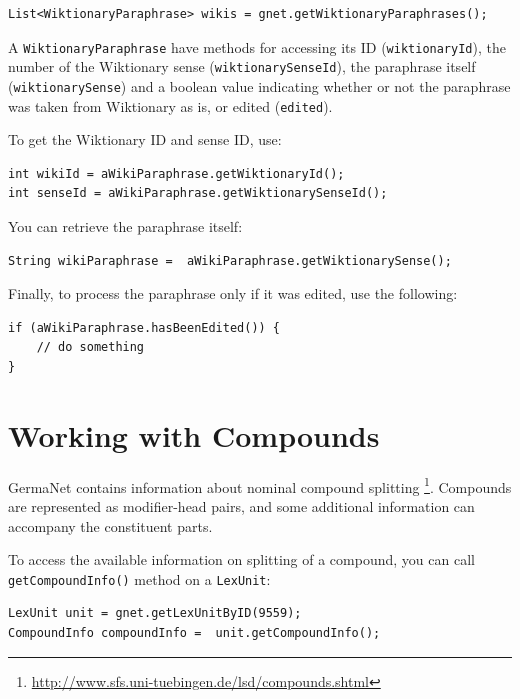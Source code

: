 \documentclass[12pt,a4paper,english,utf8]{report}
\begin{document}
\begin{lstlisting}
List<WiktionaryParaphrase> wikis = gnet.getWiktionaryParaphrases();
\end{lstlisting}

\begin{sloppypar}
A \texttt{WiktionaryParaphrase} have methods for accessing its ID (\texttt{wiktionaryId}), the number of the Wiktionary sense (\texttt{wiktionarySenseId}), the paraphrase itself (\texttt{wiktionarySense}) and a boolean value indicating whether or not the paraphrase was taken from Wiktionary as is, or edited (\texttt{edited}).
\end{sloppypar}

To get the Wiktionary ID and sense ID, use:

\begin{lstlisting}
int wikiId = aWikiParaphrase.getWiktionaryId();
int senseId = aWikiParaphrase.getWiktionarySenseId();
\end{lstlisting}

You can retrieve the paraphrase itself:

\begin{lstlisting}
String wikiParaphrase =  aWikiParaphrase.getWiktionarySense();
\end{lstlisting}

Finally, to process the paraphrase only if it was edited, use the following: 

\begin{lstlisting}
if (aWikiParaphrase.hasBeenEdited()) {
    // do something 
}
\end{lstlisting}




\section{Working with Compounds}

GermaNet contains information about nominal compound splitting \footnote{\url{http://www.sfs.uni-tuebingen.de/lsd/compounds.shtml}}. Compounds are represented as modifier-head pairs, and some additional information can accompany the constituent parts. 

To access the available information on splitting of a compound, you can call \texttt{getCompoundInfo()} method on a \texttt{LexUnit}:

\begin{lstlisting}
LexUnit unit = gnet.getLexUnitByID(9559);
CompoundInfo compoundInfo =  unit.getCompoundInfo();
\end{lstlisting}
\end{document}
